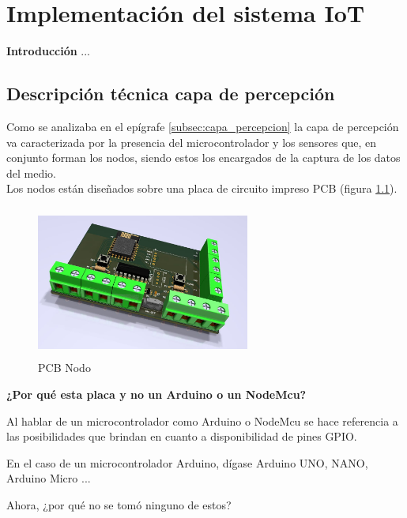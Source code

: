 \chapter{Implementación del sistema IoT}\label{cap: }

        \textbf{\Large Introducción}\newline
        ...

\section{Descripción técnica capa de percepción}

Como se analizaba en el epígrafe \ref{subsec:capa_percepcion} la capa de percepción va caracterizada por la presencia del microcontrolador y los sensores que, en conjunto forman los nodos, siendo estos los
encargados de la captura de los datos del medio.\\

Los nodos están diseñados sobre una placa de circuito impreso PCB (figura \ref{imag:pcb_nodo}).

\begin{figure}[H]
    \centering
    \includegraphics[width=7cm, height=5cm]{imagenes/vista 3D.jpg}
    \caption{PCB Nodo}
    \label{imag:pcb_nodo}
\end{figure}

\textbf{¿Por qué esta placa y no un Arduino o un NodeMcu?}

Al hablar de un microcontrolador como Arduino o NodeMcu se hace referencia a las posibilidades que brindan en cuanto a disponibilidad de pines GPIO. 

En el caso de un microcontrolador Arduino, dígase Arduino UNO, NANO, Arduino Micro ... 

Ahora, ¿por qué no se tomó ninguno de estos?

